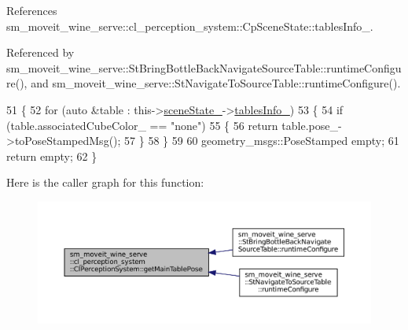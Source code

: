 References sm\+\_\+moveit\+\_\+wine\+\_\+serve\+::cl\+\_\+perception\+\_\+system\+::\+Cp\+Scene\+State\+::tables\+Info\+\_\+.



Referenced by sm\+\_\+moveit\+\_\+wine\+\_\+serve\+::\+St\+Bring\+Bottle\+Back\+Navigate\+Source\+Table\+::runtime\+Configure(), and sm\+\_\+moveit\+\_\+wine\+\_\+serve\+::\+St\+Navigate\+To\+Source\+Table\+::runtime\+Configure().


\begin{DoxyCode}
51             \{
52                 \textcolor{keywordflow}{for} (\textcolor{keyword}{auto} &table : this->\hyperlink{classsm__moveit__wine__serve_1_1cl__perception__system_1_1ClPerceptionSystem_addfd893a6f290ffc73d7f55cce9e637b}{sceneState\_}->\hyperlink{classsm__moveit__wine__serve_1_1cl__perception__system_1_1CpSceneState_aa6aea93bb143d2def50c97ec6b55e4cf}{tablesInfo\_})
53                 \{
54                     \textcolor{keywordflow}{if} (table.associatedCubeColor\_ == \textcolor{stringliteral}{"none"})
55                     \{
56                         \textcolor{keywordflow}{return} table.pose\_->toPoseStampedMsg();
57                     \}
58                 \}
59 
60                 geometry\_msgs::PoseStamped empty;
61                 \textcolor{keywordflow}{return} empty;
62             \}
\end{DoxyCode}
Here is the caller graph for this function\+:
\nopagebreak
\begin{figure}[H]
\begin{center}
\leavevmode
\includegraphics[width=350pt]{classsm__moveit__wine__serve_1_1cl__perception__system_1_1ClPerceptionSystem_ad9dec4dd1bb5ddebd6ad76ccd6b5bbf0_icgraph}
\end{center}
\end{figure}
\mbox{\label{classsm__moveit__wine__serve_1_1cl__perception__system_1_1ClPerceptionSystem_a13bcd31217e9eda88d966d3ec142a465}} 
